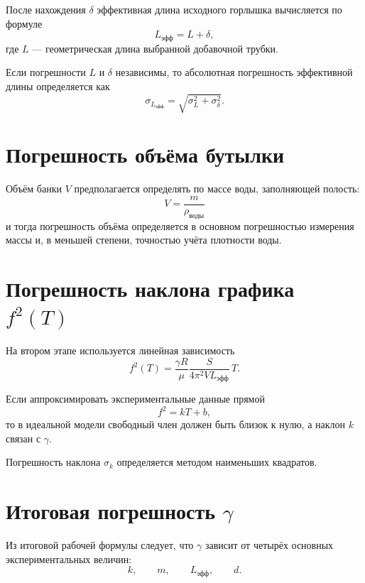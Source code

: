 \documentclass[12pt]{extreport}
\begin{document}
	
	После нахождения \(\delta\) эффективная длина исходного горлышка вычисляется по формуле
	\begin{equation}
		L_{\text{эфф}}=L+\delta,
	\end{equation}
	где \(L\) --- геометрическая длина выбранной добавочной трубки.
	
	Если погрешности \(L\) и \(\delta\) независимы, то абсолютная погрешность эффективной длины определяется как
	\begin{equation}
		\sigma_{L_{\text{эфф}}}
		=
		\sqrt{
			\sigma_{L}^2+\sigma_\delta^2
		}.
		\label{eq:sigma_Leff}
	\end{equation}
	
	
	

	
	\section{Погрешность объёма бутылки}
	
	Объём банки \(V\) предполагается определять по массе воды, заполняющей полость:
	\[
	V=\frac{m}{\rho_{\text{воды}}} 
	\]
	и тогда погрешность объёма определяется в основном погрешностью измерения массы и, в меньшей степени, точностью учёта плотности воды.
	
	\section{Погрешность наклона графика \(f^2(T)\)}
	
	На втором этапе используется линейная зависимость
	\begin{equation}
		f^2(T)=
		\frac{\gamma R}{\mu}
		\frac{S}{4\pi^2 V L_{\text{эфф}}}
		\,T.
		\label{eq:err_f2T}
	\end{equation}
	
	Если аппроксимировать экспериментальные данные прямой
	\[
	f^2=kT+b,
	\]
	то в идеальной модели свободный член должен быть близок к нулю, а наклон \(k\) связан с \(\gamma\).
	
	Погрешность наклона \(\sigma_k\) определяется методом наименьших квадратов.
	
	
	\section{Итоговая погрешность \(\gamma\)}
	
	Из итоговой рабочей формулы следует, что \(\gamma\) зависит от четырёх основных экспериментальных величин:
	\[
	k,\qquad m,\qquad L_{\text{эфф}},\qquad d.
	\]
	
\end{document}
